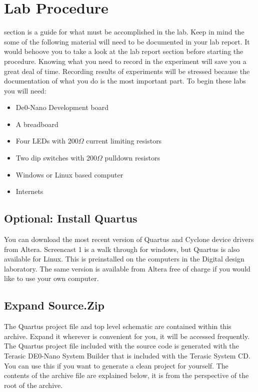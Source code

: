   \section{Lab Procedure}
     section is a guide for what must be accomplished in the lab. Keep in mind the some of the following material will need to be documented in your lab report. It would behoove you to take a look at the lab report section before starting the procedure. Knowing what you need to record in the experiment will save you a great deal of time. Recording results of experiments will be stressed because the documentation of what you do is the most important part. To begin these labs you will need:
    \begin{itemize}
      \item De0-Nano Development board
      \item A breadboard
      \item Four LEDs with 200$\Omega$ current limiting resistors
      \item Two dip switches with 200$\Omega$ pulldown resistors
      \item Windows or Linux based computer
      \item Internets
    \end{itemize}

    \subsection{Optional: Install Quartus}
    You can download the most recent version of Quartus and Cyclone device drivers from Altera. Screencast 1
    is a walk through for windows, but Quartus is also available for Linux. This is preinstalled on the computers in the Digital design laboratory. The same version is available from Altera free of charge if you would like to use your own computer.

    \subsection{Expand Source.Zip}
    The Quartus project file and top level schematic are contained within this archive. Expand it wherever is convenient for you, it will be accessed frequently. The Quartus project file included with the source code is generated with the Terasic DE0-Nano System Builder that is included with the Terasic System CD. You can use this if you want to generate a clean project for yourself. The contents of the archive file are explained below, it is from the perspective of the root of the archive.

